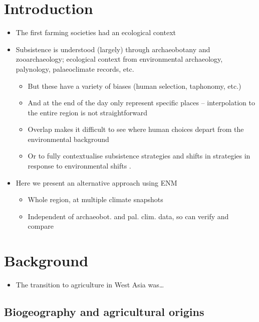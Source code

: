 \documentclass[
  authoryear,
  review]{elsarticle}
\providecommand{\tightlist}{%
  \setlength{\itemsep}{0pt}\setlength{\parskip}{0pt}}\usepackage{longtable,booktabs,array}
\begin{document}
\section{Introduction}\label{introduction}

\begin{itemize}
\tightlist
\item
  The first farming societies had an ecological context
\item
  Subsistence is understood (largely) through archaeobotany and
  zooarchaeology; ecological context from environmental archaeology,
  palynology, palaeoclimate records, etc.

  \begin{itemize}
  \tightlist
  \item
    But these have a variety of biases (human selection, taphonomy,
    etc.)
  \item
    And at the end of the day only represent specific places --
    interpolation to the entire region is not straightforward
  \item
    Overlap makes it difficult to see where human choices depart from
    the environmental background \citep[cf.][]{MartinEtAl2016}
  \item
    Or to fully contextualise subsistence strategies and shifts in
    strategies in response to environmental shifts
    \citep[e.g.][]{YaworskyEtAl2023}.
  \end{itemize}
\item
  Here we present an alternative approach using ENM

  \begin{itemize}
  \tightlist
  \item
    Whole region, at multiple climate snapshots
  \item
    Independent of archaeobot. and pal. clim. data, so can verify and
    compare
  \end{itemize}
\end{itemize}

\section{Background}\label{background}

\begin{itemize}
\tightlist
\item
  The transition to agriculture in West Asia was\ldots{}
\end{itemize}

\subsection{Biogeography and agricultural
origins}\label{biogeography-and-agricultural-origins}
\end{document}
